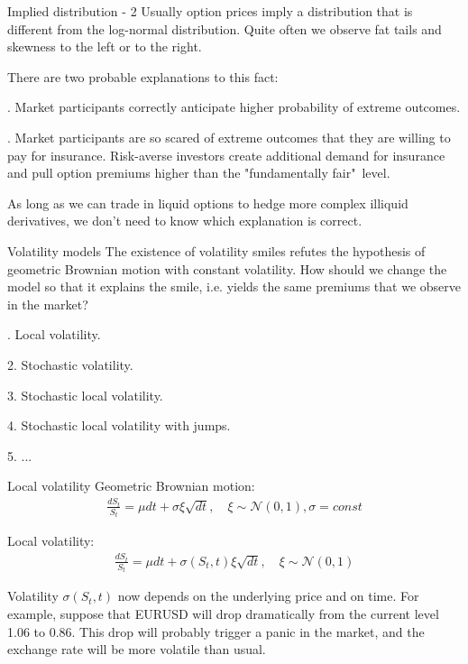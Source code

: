 \documentclass{beamer}
\begin{document}
\begin{frame}{Implied distribution - 2}
\justify
Usually option prices imply a distribution that is different from the log-normal distribution. Quite often we observe fat tails and skewness to the left or to the right.

\justify
There are two probable explanations to this fact:

. Market participants correctly anticipate higher probability of extreme outcomes.

. Market participants are so scared of extreme outcomes that they are willing to pay for insurance. Risk-averse investors create additional demand for insurance and pull option premiums higher than the "fundamentally fair"\ level.

\justify
As long as we can trade in liquid options to hedge more complex illiquid derivatives, we don't need to know which explanation is correct.
\end{frame}



\begin{frame}{Volatility models}
\justify
The existence of volatility smiles refutes the hypothesis of geometric Brownian motion with constant volatility. How should we change the model so that it explains the smile, i.e. yields the same premiums that we observe in the market?

. Local volatility.

2. Stochastic volatility.

3. Stochastic local volatility.

4. Stochastic local volatility with jumps.

5. ...
\end{frame}



\begin{frame}{Local volatility}
\justify
Geometric Brownian motion:
\begin{align*}
\frac{dS_t}{S_t} = \mu dt + \sigma\xi\sqrt{dt}, \quad \xi \sim \mathcal{N}(0, 1), \sigma = const
\end{align*}

\justify
Local volatility:
\begin{align*}
\frac{dS_t}{S_t} = \mu dt + \sigma(S_t, t)\xi\sqrt{dt}, \quad \xi \sim \mathcal{N}(0, 1)
\end{align*}

\justify
Volatility $\sigma(S_t, t)$ now depends on the underlying price and on time. For example, suppose that EURUSD will drop dramatically from the current level 1.06 to 0.86. This drop will probably trigger a panic in the market, and the exchange rate will be more volatile than usual.
\end{frame}
\end{document}
